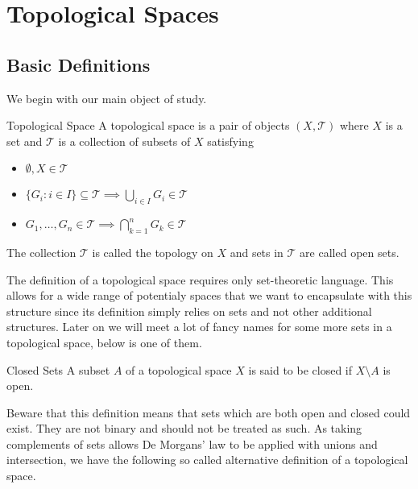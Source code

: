\section{Topological Spaces}
\subsection{Basic Definitions}
We begin with our main object of study. 
\begin{defn}{Topological Space}{} A topological space is a pair of objects $(X,\mathcal{T})$ where $X$ is a set and $\mathcal{T}$ is a collection of subsets of $X$ satisfying
\begin{itemize}
\item $\emptyset,X\in\mathcal{T}$
\item $\{G_i:i\in I\}\subseteq\mathcal{T}\implies\bigcup_{i\in I}G_i\in\mathcal{T}$
\item $G_1,\dots,G_n\in\mathcal{T}\implies\bigcap_{k=1}^nG_k\in\mathcal{T}$
\end{itemize} The collection $\mathcal{T}$ is called the topology on $X$ and sets in $\mathcal{T}$ are called open sets. 
\end{defn}

The definition of a topological space requires only set-theoretic language. This allows for a wide range of potentialy spaces that we want to encapsulate with this structure since its definition simply relies on sets and not other additional structures. Later on we will meet a lot of fancy names for some more sets in a topological space, below is one of them. 

\begin{defn}{Closed Sets}{} A subset $A$ of a topological space $X$ is said to be closed if $X\setminus A$ is open. 
\end{defn}

Beware that this definition means that sets which are both open and closed could exist. They are not binary and should not be treated as such. As taking complements of sets allows De Morgans' law to be applied with unions and intersection, we have the following so called alternative definition of a topological space. 

